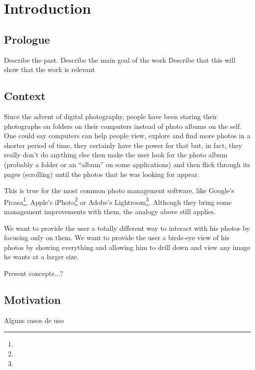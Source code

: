 \chapter{Introduction} %
\label{chapter:introduction}


\section{Prologue} %
\label{sec:prologue}

Describe the past.
Describe the main goal of the work
Describe that this will show that the work is relevant



\section{Context} %
\label{sec:context}

Since the advent of digital photography, people have been storing their photographs on folders on their computers instead of photo albums on the self. One could say computers can help people view, explore and find more photos in a shorter period of time, they certainly have the power for that but, in fact, they really don't do anything else then make the user look for the photo album (probably a folder or an ``album'' on some applications) and then flick through its pages (scrolling) until the photos that he was looking for appear.

This is true for the most common photo management software, like Google's Picasa\footnote{}, Apple's iPhoto\footnote{} or Adobe's Lightroom\footnote{}. Although they bring some management improvements with them, the analogy above still applies.

We want to provide the user a totally different way to interact with his photos by focusing only on them. We want to provide the user a birds-eye view of his photos by showing everything and allowing him to drill down and view any image he wants at a larger size.


Present concepts...?


\section{Motivation} %
\label{sec:motivation}

Alguns casos de uso
